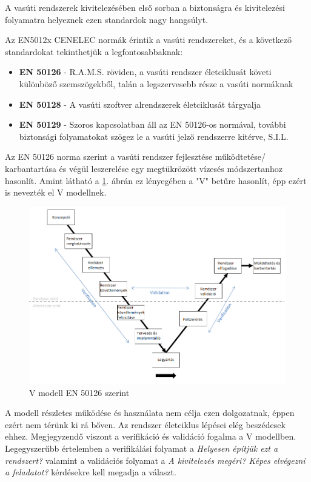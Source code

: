 \documentclass[a4paper,12pt]{article}
\begin{document}
A vasúti rendszerek kivitelezésében első sorban a biztonságra és kivitelezési folyamatra helyeznek ezen standardok nagy hangsúlyt.

Az EN5012x CENELEC normák érintik a vasúti rendszereket, és a következő standardokat tekinthetjük a legfontosabbaknak:
\begin{itemize}
	\item \textbf{EN 50126} - R.A.M.S. röviden, a vasúti rendszer életciklusát követi különböző szemszögekből, talán a legszervesebb része a vasúti normáknak
	\item \textbf{EN 50128} - A vasúti szoftver alrendszerek életciklusát tárgyalja
	\item \textbf{EN 50129} - Szoros kapcsolatban áll az EN 50126-os normával, további biztonsági folyamatokat szögez le a vasúti jelző rendszerre kitérve, S.I.L.
\end{itemize}



Az EN 50126 norma szerint a vasúti rendszer fejlesztése működtetése/ karbantartása és végül leszerelése egy megtükrözött vízesés módszertanhoz hasonlít.
Amint látható a \ref{fig:cenelec_vmodel}. ábrán ez lényegében a "V" betűre hasonlít, épp ezért is nevezték el V modellnek.

\begin{figure}[htbp]
	\centering
    \includegraphics[width=\linewidth]{images/CENELEC_vmodel.png}
    \caption[V modell] {V modell EN 50126 szerint}
    \label{fig:cenelec_vmodel}
\end{figure}

A modell részletes működése és használata nem célja ezen dolgozatnak, éppen ezért nem térünk ki rá bőven. Az rendszer életciklus lépései elég beszédesek ehhez.
Megjegyzendő viszont a verifikáció és validáció fogalma a V modellben. 
Legegyszerűbb értelemben a verifikálási folyamat a \textit{Helyesen építjük ezt a rendszert?} valamint a validációs folyamat a \textit{A kivitelezés megéri? Képes elvégezni a feladatot?} kérdésekre kell megadja a választ.
\end{document}
